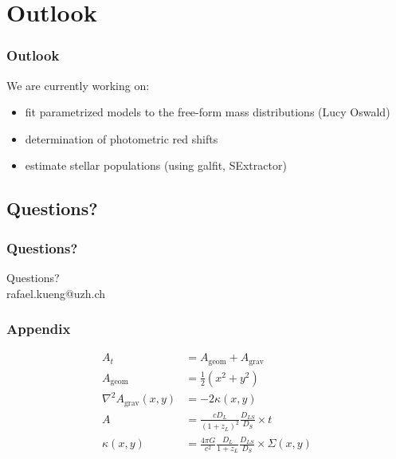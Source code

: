 \documentclass[aspectratio=1610]{beamer}
\begin{document}
%






\section{Outlook}

\begin{frame}
  \frametitle{Outlook}
  We are currently working on:
  \begin{itemize}
  	\item fit parametrized models to the free-form mass distributions (Lucy Oswald)
    \item determination of photometric red shifts
    \item estimate stellar populations (using galfit, SExtractor)
  \end{itemize}
\end{frame}



\subsection*{Questions?}

\begin{frame}
  \frametitle{Questions?}
  Questions? \\
  rafael.kueng@uzh.ch
\end{frame}




\appendix

\begin{frame}
  \frametitle{Appendix}
\end{frame}

\begin{frame}
  \begin{align}
    A_t &= A_\text{geom} + A_\text{grav}\\
    A_\text{geom} &= \frac{1}{2}\left(x^2+y^2\right)\\
    \nabla^2 A_\text{grav}\left(x,y\right) &= -2\kappa\left(x,y\right)\\
    A           &= \frac{cD_L}{(1+z_L)^2} \frac{D_{LS}}{D_S} \times t \\
    \kappa(x,y) &= \frac{4\pi G}{c^2} \frac{D_L}{1+z_L} \frac{D_{LS}}{D_S} \times \Sigma(x,y)
  \end{align}
  
\end{frame}
\end{document}
